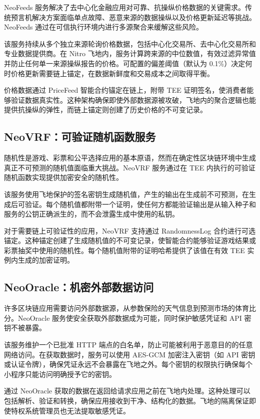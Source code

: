 \documentclass[11pt,a4paper]{article}
\begin{document}
NeoFeeds 服务解决了去中心化金融应用对可靠、抗操纵价格数据的关键需求。传统预言机解决方案面临单点故障、恶意来源的数据操纵以及价格更新延迟等挑战。NeoFeeds 通过在可信执行环境内进行多源聚合来缓解这些风险。

该服务持续从多个独立来源轮询价格数据，包括中心化交易所、去中心化交易所和专业数据提供商。在 Nitro 飞地内，服务计算跨来源的中位数值，有效过滤异常值并防止任何单一来源操纵报告的价格。可配置的偏差阈值（默认为 0.1\%）决定何时价格更新需要链上锚定，在数据新鲜度和交易成本之间取得平衡。

价格数据通过 PriceFeed 智能合约锚定在链上，附带 TEE 证明签名，使消费者能够验证数据真实性。这种架构确保即使外部数据源被攻破，飞地内的聚合逻辑也能提供抗操纵的弹性，而链上锚定则创建了历史价格的不可变记录。

\subsection{NeoVRF：可验证随机函数服务}

随机性是游戏、彩票和公平选择应用的基本原语，然而在确定性区块链环境中生成真正不可预测的随机值面临重大挑战。NeoVRF 服务通过在 TEE 内执行的可验证随机函数实现提供加密安全的随机性。

该服务使用飞地保护的签名密钥生成随机值，产生的输出在生成前不可预测，在生成后可验证。每个随机值都附带一个证明，使任何方都能验证输出是从输入种子和服务的公钥正确派生的，而不会泄露生成中使用的私钥。

对于需要链上可验证性的应用，NeoVRF 支持通过 RandomnessLog 合约进行可选锚定。这种锚定创建了生成随机值的不可变记录，使智能合约能够验证游戏结果或彩票抽奖中使用的随机性。每个随机值附带的证明哈希提供了该值在有效 TEE 实例内生成的加密证明。

\subsection{NeoOracle：机密外部数据访问}

许多区块链应用需要访问外部数据源，从参数保险的天气信息到预测市场的体育比分。NeoOracle 服务使安全获取外部数据成为可能，同时保护敏感凭证和 API 密钥不被暴露。

该服务维护一个已批准 HTTP 端点的白名单，防止可能被利用于恶意目的的任意网络访问。在获取数据时，服务可以使用 AES-GCM 加密注入密钥（如 API 密钥或认证令牌），确保凭证永远不会暴露在飞地之外。每个密钥的权限执行确保每个小程序只能访问明确授予它的密钥。

通过 NeoOracle 获取的数据在返回给请求应用之前在飞地内处理。这种处理可以包括解析、验证和转换，确保应用接收到干净、结构化的数据。飞地的隔离保证即使特权系统管理员也无法提取敏感凭证。
\end{document}
